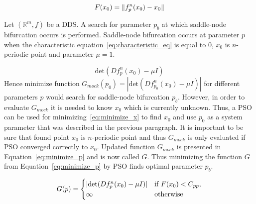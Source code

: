 \begin{equation}
\label{eq:minimize_x}
    F(x_0) = \lVert f^{n}_{p}(x_0)-x_0\rVert
\end{equation}

\par
Let $(\mathbb{R}^{m}, f)$ be a DDS.
A search for parameter $p_b$ at which saddle-node bifurcation occurs is performed.
Saddle-node bifurcation occurs at parameter $p$ when the characteristic equation~\ref{eq:characteristic_eq} is equal to $0$, $x_0$ is $n$-periodic point and parameter $\mu = 1$.

\begin{equation}
\label{eq:characteristic_eq}
        \text{det}(Df^{n}_{p}(x_0)-\mu I)
\end{equation}
Hence minimize function $G_{mock}(p_0) = |\text{det}(Df^{n}_{p_0}(x_0)-\mu I)|$ for different parameters $p$ would search for saddle-node bifurcation $p_b$.
However, in order to evaluate $G_{mock}$ it is needed to know $x_0$ which is currently unknown.
Thus, a PSO can be used for minimizing~\ref{eq:minimize_x} to find $x_0$ and use $p_0$ as a system parameter that was described in the previous paragraph.
It is important to be sure that found point $x_0$ is $n$-periodic point and thus $G_{mock}$ is only evaluated if PSO converged correctly to $x_0$.
Updated function $G_{mock}$ is presented in Equation~\eqref{eq:minimize_p} and is now called $G$.
Thus minimizing the function $G$ from Equation~\eqref{eq:minimize_p} by PSO finds optimal parameter $p_b$.

\begin{equation}
\label{eq:minimize_p}
    G(p) =
    \begin{cases}
        |\text{det}(Df^{n}_{p}(x_0)-\mu I)| & \text{if } F(x_0) < C_{pp}, \\
        \infty & \rm{otherwise}
    \end{cases}
\end{equation}

